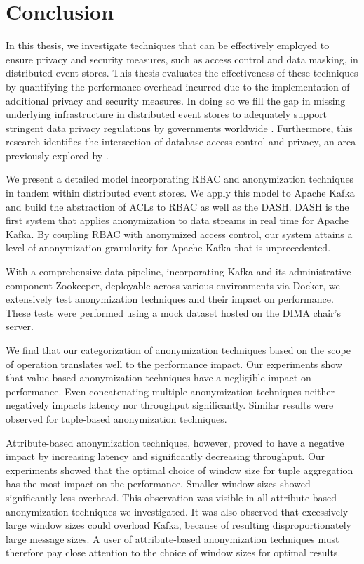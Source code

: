 \chapter{Conclusion\label{cha:chapter7}}
In this thesis, we investigate techniques that can be effectively employed to ensure privacy and security measures, such as access control and data masking, in distributed event stores. This thesis evaluates the effectiveness of these techniques by quantifying the performance overhead incurred due to the implementation of additional privacy and security measures. In doing so we fill the gap in missing underlying infrastructure in distributed event stores to adequately support stringent data privacy regulations by governments worldwide \cite{Colombo2015}. Furthermore, this research identifies the intersection of database access control and privacy, an area previously explored by \cite{chaudhuri2011database}. \par
We present a detailed model incorporating \ac{RBAC} and anonymization techniques in tandem within distributed event stores. We apply this model to Apache Kafka and build the abstraction of \acp{ACL} to \ac{RBAC} as well as the \acf{DASH}. \ac{DASH} is the first system that applies anonymization to data streams in real time for Apache Kafka. By coupling \ac{RBAC} with anonymized access control, our system attains a level of anonymization granularity for Apache Kafka that is unprecedented. \par
With a comprehensive data pipeline, incorporating Kafka and its administrative component Zookeeper, deployable across various environments via Docker, we extensively test anonymization techniques and their impact on performance. These tests were performed using a mock dataset hosted on the \ac{DIMA} chair's server. \par
We find that our categorization of anonymization techniques based on the scope of operation translates well to the performance impact. Our experiments show that value-based anonymization techniques have a negligible impact on performance. Even concatenating multiple anonymization techniques neither negatively impacts latency nor throughput significantly. Similar results were observed for tuple-based anonymization techniques.\par 
Attribute-based anonymization techniques, however, proved to have a negative impact by increasing latency and significantly decreasing throughput. Our experiments showed that the optimal choice of window size for tuple aggregation has the most impact on the performance. Smaller window sizes showed significantly less overhead. This observation was visible in all attribute-based anonymization techniques we investigated. It was also observed that excessively large window sizes could overload Kafka, because of resulting disproportionately large message sizes. A user of attribute-based anonymization techniques must therefore pay close attention to the choice of window sizes for optimal results. \par

